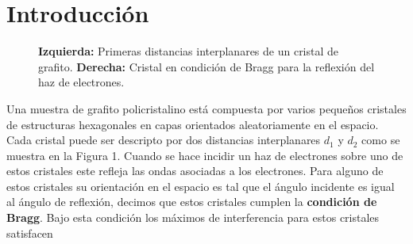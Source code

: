 \documentclass[a4paper, 10pt, spanish]{article}
\numberwithin{equation}{section}
\numberwithin{table}{section}
\begin{document}
\section{Introducción}

\begin{figure}[h]
    \begin{center}
      \hspace{1cm}
    \end{center}
    \caption{\textbf{Izquierda:} Primeras distancias interplanares de un cristal de grafito. \textbf{Derecha:} Cristal en condición de Bragg para la reflexión del haz de electrones.}
    \label{fig:distanciasinterplanares}
    \end{figure}

Una muestra de grafito policristalino está compuesta por varios pequeños cristales de estructuras hexagonales en capas orientados aleatoriamente en el espacio. Cada cristal puede ser descripto por dos distancias interplanares $d_1$ y $d_2$ como se muestra en la Figura 1. Cuando se hace incidir un haz de electrones sobre uno de estos cristales este refleja las ondas asociadas a los electrones. Para alguno de estos cristales su orientación en el espacio es tal que el ángulo incidente es igual al ángulo de reflexión, decimos que estos cristales cumplen la \textbf{condición de Bragg}. Bajo esta condición los máximos de interferencia para estos cristales satisfacen
\end{document}
